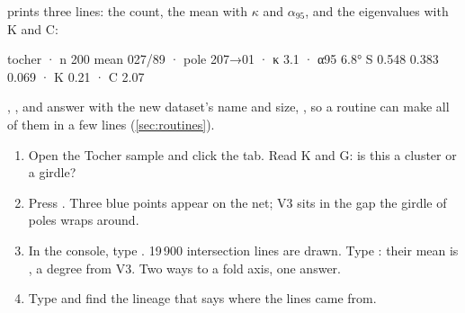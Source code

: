  prints three lines: the count, the mean with $\kappa$ and $\alpha_{95}$, and the eigenvalues
with K and C:

\begin{codeblock}
tocher · n 200
mean 027/89 · pole 207→01 · κ 3.1 · α95 6.8°
S 0.548 0.383 0.069 · K 0.21 · C 2.07
\end{codeblock}

, ,  and  answer with the new dataset's name and size,
, so a routine can make all of them in a few lines
(\cref{sec:routines}).

\begin{tryit}
\begin{enumerate}
\item Open the Tocher sample and click the  tab. Read K and G: is this a cluster or a
girdle?
\item Press . Three blue points appear on the net; V3 sits in the gap the girdle
of poles wraps around.
\item In the console, type . 19\,900 intersection lines are drawn. Type
: their mean is , a degree from V3. Two ways to a fold axis, one
answer.
\item Type  and find the lineage that says where the lines came from.
\end{enumerate}
\end{tryit}
